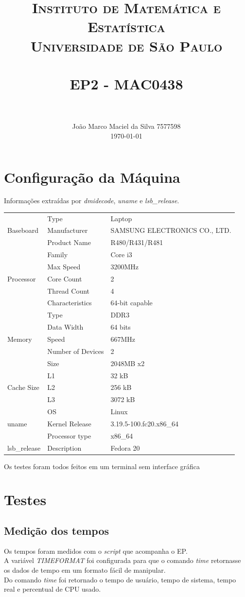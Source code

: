 \documentclass[paper=a4, fontsize=11pt]{scrartcl}
\title{
		\usefont{OT1}{bch}{b}{n}
		\normalfont \normalsize \textsc{Instituto de Matemática e Estatística\\Universidade de São Paulo} \\ [25pt]
		\horrule{0.5pt} \\[0.4cm]
		\huge EP2 - MAC0438 \\
		\horrule{2pt} \\[0.5cm]
}
\author{
		\normalfont 								\normalsize
        João Marco Maciel da Silva 7577598\\
        \normalsize
        \today
}
\date{}
\numberwithin{equation}{section}		%
\numberwithin{figure}{section}			%
\numberwithin{table}{section}				%
\begin{document}
\maketitle
\section{Configuração da Máquina}
Informações extraídas por \textit{dmidecode}, \textit{uname} e \textit{lsb\_release}.\\

\begin{tabular}{lll}
	\multirow{3}{*}{Baseboard} & Type& Laptop\\
	& Manufacturer& SAMSUNG ELECTRONICS CO., LTD.\\
	& Product Name& R480/R431/R481\\
	\hline
	\multirow{5}{*}{Processor}& Family& Core i3\\
	& Max Speed& 3200MHz\\
	& Core Count& 2\\
	& Thread Count& 4\\
	& Characteristics& 64-bit capable\\
	\hline
	\multirow{5}{*}{Memory}& Type& DDR3\\
	& Data Width& 64 bits\\
	& Speed& 667MHz\\
	& Number of Devices& 2\\
	& Size& 2048MB x2\\
	\hline
	\multirow{3}{*}{Cache Size}& L1& 32 kB\\
	& L2& 256 kB\\
	& L3& 3072 kB\\
	\hline
	\multirow{3}{*}{uname}& OS& Linux\\
	& Kernel Release& 3.19.5-100.fc20.x86\_64\\
	& Processor type& x86\_64\\
	\hline
	\multirow{1}{*}{lsb\_release}& Description& Fedora 20\\
\end{tabular}

Os testes foram todos feitos em um terminal sem interface gráfica
\section{Testes}
\subsection{Medição dos tempos}
Os tempos foram medidos com o \textit{script} que acompanha o EP.\\
A variável \textit{TIMEFORMAT} foi configurada para que o comando \textit{time} retornasse os dados de tempo em um formato fácil de manipular.\\
Do comando \textit{time} foi retornado o tempo de usuário, tempo de sistema, tempo real e percentual de CPU usado.\\
\end{document}
